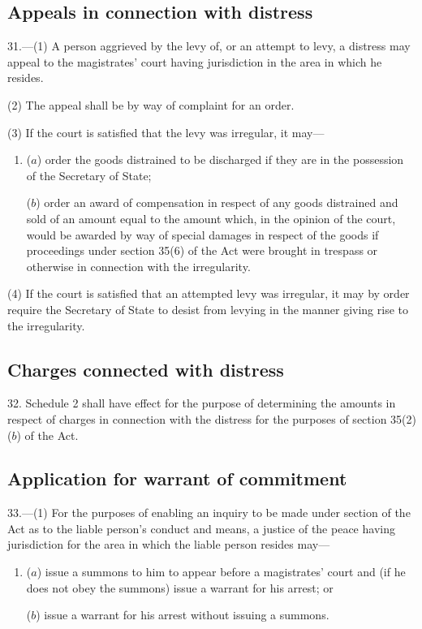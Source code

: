 \documentclass[12pt,a4paper]{article}
\begin{document}
\subsection[31. Appeals in connection with distress]{Appeals in connection with distress}

31.—(1) A person aggrieved by the levy of, or an attempt to levy, a distress may appeal to the magistrates' court having jurisdiction in the area in which he resides.

(2) The appeal shall be by way of complaint for an order.

(3) If the court is satisfied that the levy was irregular, it may—
\begin{enumerate}\item[]
($a$) order the goods distrained to be discharged if they are in the possession of the Secretary of State;

($b$) order an award of compensation in respect of any goods distrained and sold of an amount equal to the amount which, in the opinion of the court, would be awarded by way of special damages in respect of the goods if proceedings under section 35(6) of the Act were brought in trespass or otherwise in connection with the irregularity.
\end{enumerate}

(4) If the court is satisfied that an attempted levy was irregular, it may by order require the Secretary of State to desist from levying in the manner giving rise to the irregularity.

\subsection[32. Charges connected with distress]{Charges connected with distress}

32.  Schedule 2 shall have effect for the purpose of determining the amounts in respect of charges in connection with the distress for the purposes of section 35(2)($b$) of the Act.

\subsection[33. Application for warrant of commitment]{Application for warrant of commitment}

33.—(1) For the purposes of enabling an inquiry to be made under section 
of the Act as to the liable person’s conduct and means, a justice of the peace having jurisdiction for the area in which the liable person resides may—
\begin{enumerate}\item[]
($a$) issue a summons to him to appear before a magistrates' court and (if he does not obey the summons) issue a warrant for his arrest; or

($b$) issue a warrant for his arrest without issuing a summons.
\end{enumerate}
\end{document}
